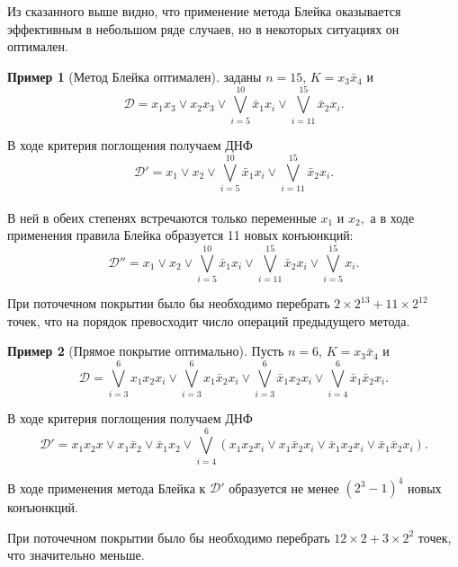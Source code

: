 \documentclass[12pt,a4paper,oneside,fleqn,leqno]{article}
\theoremstyle{definition}
\newtheorem{example}{Пример}%
\begin{document}
		Из сказанного выше видно, что применение метода Блейка оказывается эффективным в небольшом ряде случаев, но в некоторых ситуациях он оптимален.
		\begin{example}[Метод Блейка оптимален]
			\hspace{5pt} заданы $n = 15$, $K = x_3\bar{x}_4$ и 
			$$\mathcal{D} = x_1x_3 \vee x_2x_3 \vee \bigvee\limits_{i = 5}^{10}\bar{x}_1x_i \vee \bigvee\limits_{i = 11}^{15}\bar{x}_2x_i.$$\par
			В ходе критерия поглощения получаем ДНФ
			$$\mathcal{D}' = x_1 \vee x_2 \vee \bigvee\limits_{i = 5}^{10}\bar{x}_1x_i \vee \bigvee\limits_{i = 11}^{15}\bar{x}_2x_i.$$\\
			В ней в обеих степенях встречаются только переменные $x_1$ и $x_2,$ а в ходе применения правила Блейка образуется 11 новых конъюнкций:
			$$
				\mathcal{D}'' = x_1 \vee x_2 \vee \bigvee\limits_{i = 5}^{10}\bar{x}_1x_i \vee \bigvee\limits_{i = 11}^{15}\bar{x}_2x_i \vee \bigvee\limits_{i = 5}^{15}x_i.
			$$\par
			При поточечном покрытии было бы необходимо перебрать $2\times 2^{13} + {11}\times 2^{12}$ точек, что на порядок превосходит число операций предыдущего метода.
		\end{example}
		\begin{example}[Прямое покрытие оптимально]
			\hspace{5pt}\par Пусть $n = 6$, $K = x_3\bar{x}_4$ и 
			$$
				\mathcal{D} = \bigvee\limits_{i = 3}^6x_1x_2x_i \vee \bigvee\limits_{i = 3}^6x_1\bar{x}_2x_i \vee \bigvee\limits_{i = 3}^6\bar{x}_1x_2x_i \vee \bigvee\limits_{i = 4}^6\bar{x}_1\bar{x}_2x_i.
			$$\par
			В ходе критерия поглощения получаем ДНФ
			$$
				\mathcal{D}' = x_1x_2x \vee x_1\bar{x}_2 \vee \bar{x}_1x_2 \vee \bigvee\limits_{i = 4}^6(x_1x_2x_i \vee x_1\bar{x}_2x_i \vee \bar{x}_1x_2x_i \vee \bar{x}_1\bar{x}_2x_i).
			$$\par
			В ходе применения метода Блейка к $\mathcal{D}'$ образуется не менее $(2^3-1)^4$ новых конъюнкций.\par
			При поточечном покрытии было бы необходимо перебрать $12 \times 2 + 3 \times 2^2$ точек, что значительно меньше.
		\end{example}
		\newpage
\end{document}
